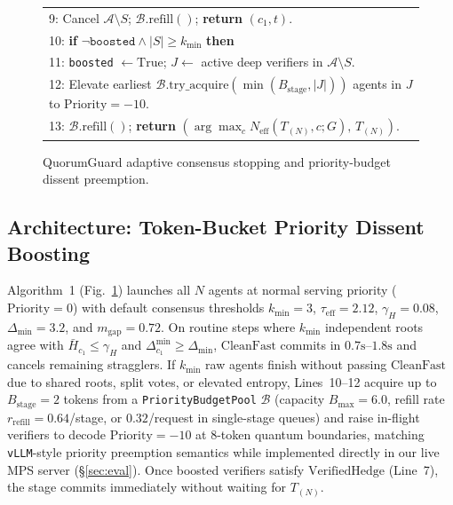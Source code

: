 \documentclass[conference]{IEEEtran}
\def\QG{QuorumGuard}%
\theoremstyle{definition}
\theoremstyle{remark}
\newcommand{\QG}{\textsc{QuorumGuard}}
\newcommand{\Neff}{N_{\mathrm{eff}}}
\begin{document}
\begin{figure}[!t]
\begin{tabular}{|p{}|}
9: \hspace{1.65em} Cancel $\mathcal{A} \setminus S$; $\mathcal{B}.\mathrm{refill}()$; \textbf{return} $(c_1, t)$. \\
10: \hspace{0.5em} \textbf{if} $\neg\texttt{boosted} \wedge |S| \ge k_{\min}$ \textbf{then} \\
11: \hspace{1.65em} \texttt{boosted} $\leftarrow \mathrm{True}$; $J \leftarrow$ active deep verifiers in $\mathcal{A} \setminus S$. \\
12: \hspace{1.65em} Elevate earliest $\mathcal{B}.\mathrm{try\_acquire}(\min(B_{\mathrm{stage}}, |J|))$ agents in $J$ to $\mathrm{Priority} = -10$. \\
13: $\mathcal{B}.\mathrm{refill}()$; \textbf{return} $(\arg\max_c \Neff(T_{(N)}, c; G),\, T_{(N)})$. \\
\hline
\end{tabular}
\caption{\QG{} adaptive consensus stopping and priority-budget dissent preemption.}\label{fig:alg1}
\end{figure}

\subsection{Architecture: Token-Bucket Priority Dissent Boosting}\label{sec:scheduler}
Algorithm~1 (Fig.~\ref{fig:alg1}) launches all $N$ agents at normal serving priority ($\mathrm{Priority} = 0$) with default consensus thresholds $k_{\min} = 3$, $\tau_{\mathrm{eff}} = 2.12$, $\gamma_H = 0.08$, $\Delta_{\min} = 3.2$, and $m_{\mathrm{gap}} = 0.72$. On routine steps where $k_{\min}$ independent roots agree with $\bar{H}_{c_1} \le \gamma_H$ and $\Delta_{c_1}^{\min} \ge \Delta_{\min}$, $\mathrm{CleanFast}$ commits in $0.7\text{s}$--$1.8\text{s}$ and cancels remaining stragglers. If $k_{\min}$ raw agents finish without passing $\mathrm{CleanFast}$ due to shared roots, split votes, or elevated entropy, Lines~10--12 acquire up to $B_{\mathrm{stage}} = 2$ tokens from a \texttt{PriorityBudgetPool} $\mathcal{B}$ (capacity $B_{\max} = 6.0$, refill rate $r_{\mathrm{refill}} = 0.64$/stage, or $0.32$/request in single-stage queues) and raise in-flight verifiers to decode $\mathrm{Priority} = -10$ at 8-token quantum boundaries, matching \texttt{vLLM}-style priority preemption semantics while implemented directly in our live MPS server (\S\ref{sec:eval}). Once boosted verifiers satisfy $\mathrm{VerifiedHedge}$ (Line~7), the stage commits immediately without waiting for $T_{(N)}$.
\end{document}
